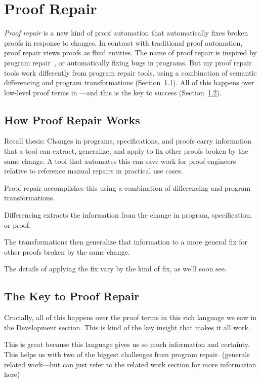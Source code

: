 \section{Proof Repair}
\label{sec:mot-rep}

\textit{Proof repair} is a new kind of proof automation that automatically fixes broken proofs in response to changes.
In contrast with traditional proof automation, proof repair views proofs as fluid entities.
The name of proof repair is inspired by program repair~\cite{Monperrus:2018:ASR:3177787.3105906, Gazzola:2018:ASR:3180155.3182526},
or automatically fixing bugs in programs.
But my proof repair tools work differently from program repair tools, 
using a combination of semantic differencing and program transformations (Section~\ref{sec:how}).
All of this happens over low-level proof terms in ---and this is the key to success (Section~\ref{sec:infocert}).

\subsection{How Proof Repair Works}
\label{sec:how}

Recall thesis: Changes in programs, specifications, and proofs carry information that a tool can extract, generalize, and apply to fix other proofs broken by the same change. A tool that automates this can save work for proof engineers relative to reference manual repairs in practical use cases.

Proof repair accomplishes this using a combination of differencing and program transformations.

Differencing extracts the information from the change in program, specification, or proof.

The transformations then generalize that information to a more general fix for other proofs broken by the same change.

The details of applying the fix vary by the kind of fix, as we'll soon see.

\subsection{The Key to Proof Repair}
\label{sec:infocert}

Crucially, all of this happens over the proof terms in this rich language we saw in the Development section. This is kind of the key insight that makes it all work.

This is great because this language gives us so much information and certainty. This helps us with two of the biggest challenges from 
program repair. (generals related work---but can just refer to the related work section for more information here)

